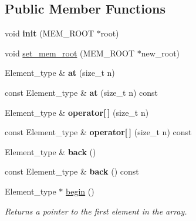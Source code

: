 \subsection*{Public Member Functions}
\begin{DoxyCompactItemize}
\item 
\mbox{\label{classMem__root__array__YY_a091a12a12e419e167c71c0db29c0766e}} 
void {\bfseries init} (M\+E\+M\+\_\+\+R\+O\+OT $\ast$root)
\item 
void \mbox{\hyperlink{classMem__root__array__YY_a777a34213998be27410cc67f086464a0}{set\+\_\+mem\+\_\+root}} (M\+E\+M\+\_\+\+R\+O\+OT $\ast$new\+\_\+root)
\item 
\mbox{\label{classMem__root__array__YY_a4ba9f5d62d0abde5b809709548df4b7e}} 
Element\+\_\+type \& {\bfseries at} (size\+\_\+t n)
\item 
\mbox{\label{classMem__root__array__YY_abe407b66fd2a36e1cd4082457b7ae5d4}} 
const Element\+\_\+type \& {\bfseries at} (size\+\_\+t n) const
\item 
\mbox{\label{classMem__root__array__YY_a29c01db114177e28bea860b7d6c7a655}} 
Element\+\_\+type \& {\bfseries operator\mbox{[}$\,$\mbox{]}} (size\+\_\+t n)
\item 
\mbox{\label{classMem__root__array__YY_a04603198aefdd918ed18609a346d2f65}} 
const Element\+\_\+type \& {\bfseries operator\mbox{[}$\,$\mbox{]}} (size\+\_\+t n) const
\item 
\mbox{\label{classMem__root__array__YY_a9bf4a7198eab5865623c1ff06842b5ee}} 
Element\+\_\+type \& {\bfseries back} ()
\item 
\mbox{\label{classMem__root__array__YY_a7cc179f271fefb5d5638dea2cf1a96ff}} 
const Element\+\_\+type \& {\bfseries back} () const
\item 
\mbox{\label{classMem__root__array__YY_a497b3e8d416fed699297a0c431f35214}} 
Element\+\_\+type $\ast$ \mbox{\hyperlink{classMem__root__array__YY_a497b3e8d416fed699297a0c431f35214}{begin}} ()
\begin{DoxyCompactList}\small\item\em Returns a pointer to the first element in the array. \end{DoxyCompactList}\item 

\end{DoxyCompactItemize}
